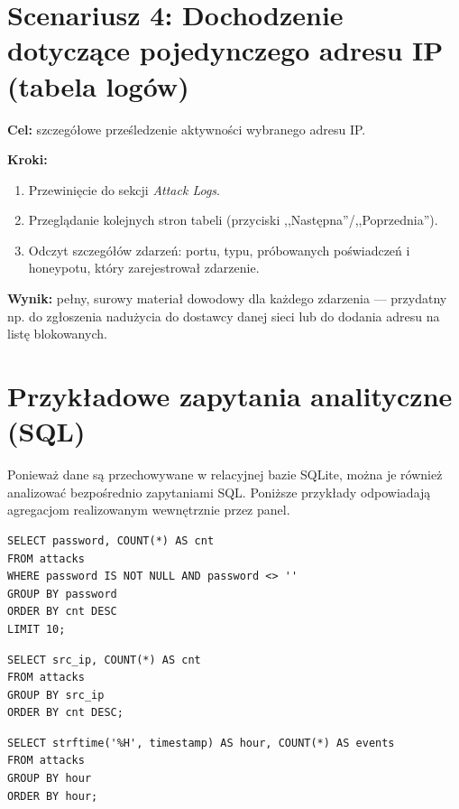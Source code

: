 \documentclass[12pt,a4paper]{report}
\begin{document}
\section{Scenariusz 4: Dochodzenie dotyczące pojedynczego adresu IP (tabela logów)}

\textbf{Cel:} szczegółowe prześledzenie aktywności wybranego adresu IP.

\textbf{Kroki:}
\begin{enumerate}
  \item Przewinięcie do sekcji \emph{Attack Logs}.
  \item Przeglądanie kolejnych stron tabeli (przyciski ,,Następna''/,,Poprzednia'').
  \item Odczyt szczegółów zdarzeń: portu, typu, próbowanych poświadczeń
        i honeypotu, który zarejestrował zdarzenie.
\end{enumerate}

\textbf{Wynik:} pełny, surowy materiał dowodowy dla każdego zdarzenia --- przydatny
np. do zgłoszenia nadużycia do dostawcy danej sieci lub do dodania adresu na
listę blokowanych.

\section{Przykładowe zapytania analityczne (SQL)}

Ponieważ dane są przechowywane w relacyjnej bazie SQLite, można je również
analizować bezpośrednio zapytaniami SQL. Poniższe przykłady odpowiadają
agregacjom realizowanym wewnętrznie przez panel.

\begin{lstlisting}[style=sqlstyle,caption={Najczęściej próbowane hasła.}]
SELECT password, COUNT(*) AS cnt
FROM attacks
WHERE password IS NOT NULL AND password <> ''
GROUP BY password
ORDER BY cnt DESC
LIMIT 10;
\end{lstlisting}

\begin{lstlisting}[style=sqlstyle,caption={Liczba unikalnych adresów IP wg kraju (po wzbogaceniu geolokalizacją).}]
SELECT src_ip, COUNT(*) AS cnt
FROM attacks
GROUP BY src_ip
ORDER BY cnt DESC;
\end{lstlisting}

\begin{lstlisting}[style=sqlstyle,caption={Aktywność w rozbiciu na godziny doby.}]
SELECT strftime('%H', timestamp) AS hour, COUNT(*) AS events
FROM attacks
GROUP BY hour
ORDER BY hour;
\end{lstlisting}
\end{document}

